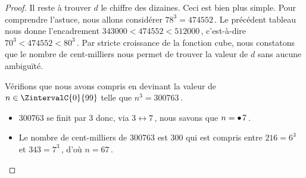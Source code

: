 \begin{proof}
    \medskip

    Il reste à trouver $d$ le chiffre des dizaines. Ceci est bien plus simple. Pour comprendre l'astuce, nous allons considérer $78^3 = \num{474552}$\,. Le précédent tableau nous donne l'encadrement $\num{343000}< \num{474552} < \num{512000}$\,, c'est-à-dire $70^3 < \num{474552} < 80^3$\,.
    Par stricte croissance de la fonction cube, nous constatons que le nombre de cent-milliers nous permet de trouver la valeur de $d$ sans aucune ambiguïté.
    
    \medskip

    Vérifions que nous avons compris en devinant la valeur de $n \in \ZintervalC{0}{99}$ telle que $n^3 = \num{300763}$\,.
    
    \begin{itemize}
    	\item \num{300763} se finit par $3$ donc, via $3 \longleftrightarrow 7$\,, nous savons que $n = \bullet\kern1pt7$\,.
	
		\item Le nombre de cent-milliers de \num{300763} est $300$ qui est compris entre $216 = 6^3$ et $343 = 7^3$\,, d'où $n = 67$\,.
    \end{itemize}
\end{proof}
